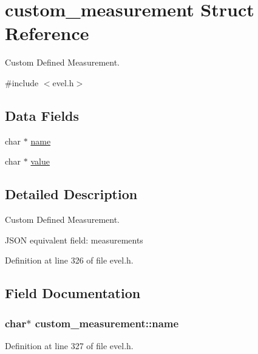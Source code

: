\hypertarget{structcustom__measurement}{}\section{custom\+\_\+measurement Struct Reference}
\label{structcustom__measurement}


Custom Defined Measurement.  




{\ttfamily \#include $<$evel.\+h$>$}

\subsection*{Data Fields}
\begin{DoxyCompactItemize}
\item 
char $\ast$ \hyperlink{structcustom__measurement_aef6a77f95bc1675dccc662585147cb75}{name}
\item 
char $\ast$ \hyperlink{structcustom__measurement_a298f50c4dd8d508b3a6d6f0aba1ddbaa}{value}
\end{DoxyCompactItemize}


\subsection{Detailed Description}
Custom Defined Measurement. 

J\+S\+O\+N equivalent field\+: measurements 

Definition at line 326 of file evel.\+h.



\subsection{Field Documentation}
\hypertarget{structcustom__measurement_aef6a77f95bc1675dccc662585147cb75}{}
\subsubsection[{name}]{\setlength{\rightskip}{0pt plus 5cm}char$\ast$ custom\+\_\+measurement\+::name}\label{structcustom__measurement_aef6a77f95bc1675dccc662585147cb75}


Definition at line 327 of file evel.\+h.

\hypertarget{structcustom__measurement_a298f50c4dd8d508b3a6d6f0aba1ddbaa}{}
